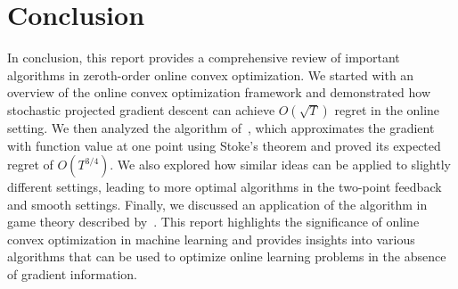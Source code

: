 \documentclass[11pt]{article}
\begin{document}
\section{Conclusion}
In conclusion, this report provides a comprehensive review of important algorithms in zeroth-order online convex optimization. We started with an overview of the online convex optimization framework and demonstrated how stochastic projected gradient descent can achieve $O(\sqrt{T})$ regret in the online setting. We then analyzed the algorithm of~\cite{flaxman2005online}, which approximates the gradient with function value at one point using Stoke's theorem and proved its expected regret of $O(T^{3/4})$. We also explored how similar ideas can be applied to slightly different settings, leading to more optimal algorithms in the two-point feedback and smooth settings. Finally, we discussed an application of the algorithm in game theory described by~\cite{bravo2018bandit}. This report highlights the significance of online convex optimization in machine learning and provides insights into various algorithms that can be used to optimize online learning problems in the absence of gradient information.



\end{document}
